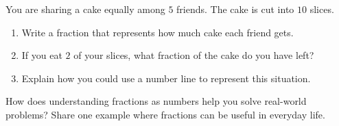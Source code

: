 \documentclass[12pt]{article}
\begin{document}
\vspace{1em}

\begin{tcolorbox}[colframe=black!60, colback=white, 
coltitle=black, colbacktitle=black!15, fonttitle=\bfseries\Large, 
title=Performance Task: Sharing a Cake, halign title=center, left=10pt, right=10pt, top=10pt, bottom=50pt]
You are sharing a cake equally among \(5\) friends. The cake is cut into \(10\) slices.
\begin{enumerate}[itemsep=7em]
    \item Write a fraction that represents how much cake each friend gets.
    \item If you eat \(2\) of your slices, what fraction of the cake do you have left?
    \item Explain how you could use a number line to represent this situation.
    \vspace{3cm}
\end{enumerate}
\end{tcolorbox}

\vspace{1em}

\begin{tcolorbox}[colframe=black!60, colback=white, 
coltitle=black, colbacktitle=black!15, fonttitle=\bfseries\Large, 
title=Reflection, halign title=center, left=10pt, right=10pt, top=10pt, bottom=80pt]
How does understanding fractions as numbers help you solve real-world problems? Share one example where fractions can be useful in everyday life.

\vspace{3cm}

\end{tcolorbox}
\end{document}
